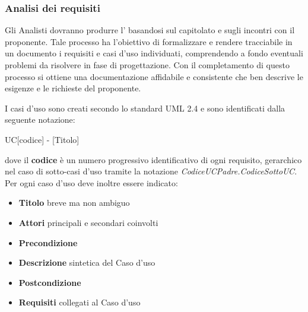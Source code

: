 \documentclass[12pt,a4paper]{article}
\begin{document}
\subsubsection{Analisi dei requisiti}
Gli Analisti dovranno produrre l'\AdR{} basandosi sul capitolato e sugli incontri con il proponente. Tale processo ha l'obiettivo di formalizzare e rendere tracciabile in un documento i requisiti e casi d'uso individuati, comprendendo a fondo eventuali problemi da risolvere in fase di progettazione. Con il completamento di questo processo si ottiene una documentazione affidabile e consistente che ben descrive le esigenze e le richieste del proponente.

I casi d'uso sono creati secondo lo standard UML 2.4 e sono identificati dalla seguente notazione:
\begin{center}
	UC[codice] - [Titolo]
\end{center}
dove il \textbf{codice} è un numero progressivo identificativo di ogni requisito, gerarchico nel  caso di sotto-casi d'uso tramite la notazione \textit{CodiceUCPadre.CodiceSottoUC}. Per ogni caso d'uso deve inoltre essere indicato:
\begin{itemize}
	\item \textbf{Titolo} breve ma non ambiguo
	\item \textbf{Attori} principali e secondari coinvolti
	\item \textbf{Precondizione}
	\item \textbf{Descrizione} sintetica del Caso d'uso
	\item \textbf{Postcondizione}
	\item \textbf{Requisiti} collegati al Caso d'uso
\end{itemize}
\end{document}
